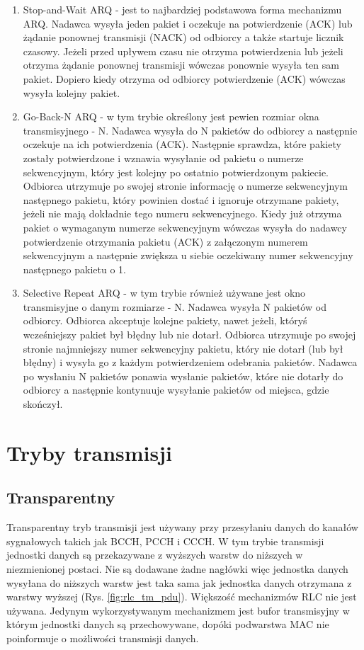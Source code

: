 \begin{enumerate}
	\item Stop-and-Wait ARQ - jest to najbardziej podstawowa forma mechanizmu ARQ. Nadawca wysyła jeden pakiet i oczekuje na potwierdzenie (ACK) lub żądanie ponownej transmisji (NACK) od odbiorcy a także startuje licznik czasowy. Jeżeli przed upływem czasu nie otrzyma potwierdzenia lub jeżeli otrzyma żądanie ponownej transmisji wówczas ponownie wysyła ten sam pakiet. Dopiero kiedy otrzyma od odbiorcy potwierdzenie (ACK) wówczas wysyła kolejny pakiet.
	\item Go-Back-N ARQ - w tym trybie określony jest pewien rozmiar okna transmisyjnego - N. Nadawca wysyła do N pakietów do odbiorcy a następnie oczekuje na ich potwierdzenia (ACK). Następnie sprawdza, które pakiety zostały potwierdzone i wznawia wysyłanie od pakietu o numerze sekwencyjnym, który jest kolejny po ostatnio potwierdzonym pakiecie. Odbiorca utrzymuje po swojej stronie informację o numerze sekwencyjnym następnego pakietu, który powinien dostać i ignoruje otrzymane pakiety, jeżeli nie mają dokładnie tego numeru sekwencyjnego. Kiedy już otrzyma pakiet o wymaganym numerze sekwencyjnym wówczas wysyła do nadawcy potwierdzenie otrzymania pakietu (ACK) z załączonym numerem sekwencyjnym a następnie zwiększa u siebie oczekiwany numer sekwencyjny następnego pakietu o 1.
	\item Selective Repeat ARQ - w tym trybie również używane jest okno transmisyjne o danym rozmiarze - N. Nadawca wysyła N pakietów od odbiorcy. Odbiorca akceptuje kolejne pakiety, nawet jeżeli, któryś wcześniejszy pakiet był błędny lub nie dotarł. Odbiorca utrzymuje po swojej stronie najmniejszy numer sekwencyjny pakietu, który nie dotarł (lub był błędny) i wysyła go z każdym potwierdzeniem odebrania pakietów. Nadawca po wysłaniu N pakietów ponawia wysłanie pakietów, które nie dotarły do odbiorcy a następnie kontynuuje wysyłanie pakietów od miejsca, gdzie skończył.
\end{enumerate}

\section{Tryby transmisji}

\subsection{Transparentny}

Transparentny tryb transmisji jest używany przy przesyłaniu danych do kanałów sygnałowych takich jak BCCH, PCCH i CCCH. W tym trybie transmisji jednostki danych są przekazywane z wyższych warstw do niższych w niezmienionej postaci. Nie są dodawane żadne nagłówki więc jednostka danych wysyłana do niższych warstw jest taka sama jak jednostka danych otrzymana z warstwy wyższej (Rys. \ref{fig:rlc_tm_pdu}). Większość mechanizmów RLC nie jest używana. Jedynym wykorzystywanym mechanizmem jest bufor transmisyjny w którym jednostki danych są przechowywane, dopóki podwarstwa MAC nie poinformuje o możliwości transmisji danych.

